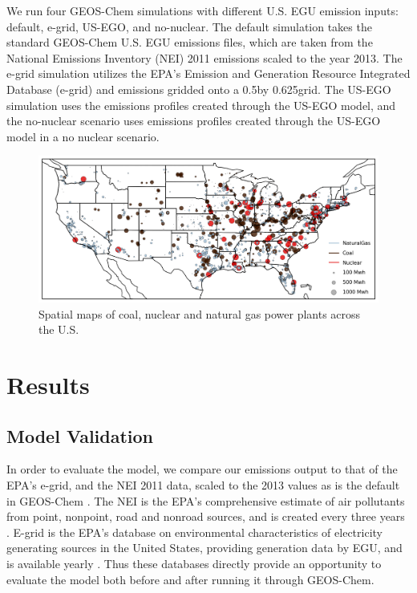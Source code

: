 \documentclass[12]{article}
\begin{document}
We run four GEOS-Chem simulations with different U.S. EGU emission inputs: default, e-grid, US-EGO, and no-nuclear. The default simulation takes the standard GEOS-Chem U.S. EGU emissions files, which are taken from the National Emissions Inventory (NEI) 2011 emissions scaled to the year 2013. The e-grid simulation utilizes the EPA's Emission and Generation Resource Integrated Database (e-grid) \citep{epa_emissions_2016}  and  emissions gridded onto a 0.5\degree by 0.625\degree grid. The US-EGO simulation uses the emissions profiles created through the US-EGO model, and the no-nuclear scenario uses emissions profiles created through the US-EGO model in a no nuclear scenario. 

\begin{figure}
    \centering
    \includegraphics[scale=0.4]{ego_nonuclear_project/Figures/plants_normal.png}
    \caption{Spatial maps of coal, nuclear and natural gas power plants across the U.S.} 
    \label{fig:plants}
\end{figure}

\section{Results}
\subsection{Model Validation}

In order to evaluate the model, we compare our emissions output to that of the EPA's e-grid, and the NEI 2011 data, scaled to the 2013 values as is the default in GEOS-Chem \citep{geos-chem_epanei11_2019}. The NEI is the EPA's comprehensive estimate of air pollutants from point, nonpoint, road and nonroad sources, and is created every three years \citep{us_epa_national_2015}. E-grid is the EPA's database on environmental characteristics of electricity generating sources in the United States, providing generation data by EGU, and is available yearly \citep{us_epa_emissions_2015}. Thus these databases directly provide an opportunity to evaluate the model both before and after running it through GEOS-Chem. 
\end{document}
